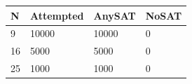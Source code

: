 \begin{tabular}{llll}
\hline
N & Attempted & AnySAT & NoSAT \\
\hline
9 & 10000 & 10000 & 0 \\
16 & 5000 & 5000 & 0 \\
25 & 1000 & 1000 & 0 \\
\hline
\end{tabular}
